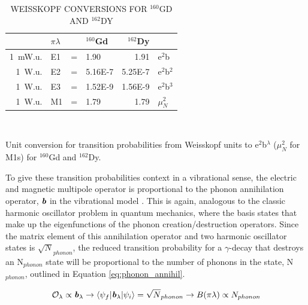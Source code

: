 \begin{table}[ht]
\centering
\caption{WEISSKOPF CONVERSIONS FOR $^{160}$GD AND $^{162}$DY \label{tab:Weisskopf_conversion}}

\begin{tabular}{rlcl|r|l}
 & $\pi\lambda$ &&  $^{160}$Gd & $^{162}$Dy \\ \hline\hline
1~mW.u.& E1 & = & 1.90    & 1.91    & e$^2$b\\
1~W.u. & E2 & = & 5.16E-7 & 5.25E-7 & e$^2$b$^2$\\
1~W.u. & E3 & = & 1.52E-9 & 1.56E-9 & e$^2$b$^3$ \\
1~W.u. & M1 & = & 1.79    & 1.79    & $\mu_N^2$ \\
\end{tabular}\\
\vspace{10pt}
\begin{normalsize}
Unit conversion for transition probabilities from Weisskopf units to e$^2$b$^\lambda$ ($\mu_N^2$ for M1s) for $^{160}$Gd and $^{162}$Dy.
\end{normalsize}
\end{table}

To give these transition probabilities context in a vibrational sense, the electric and magnetic multipole operator is proportional to the phonon annihilation operator, $\textit{\textbf{b}}$ in the vibrational model \cite{Wong_text}. This is again, analogous to the classic harmonic oscillator problem in quantum mechanics, where the basis states that make up the eigenfunctions of the phonon creation/destruction operators. Since the matrix element of this annihilation operator and two harmonic oscillator states is $\sqrt N_{phonon}$, the reduced transition probability for a $\gamma$-decay that destroys an N$_{phonon}$ state will be proportional to the number of phonons in the state, N$_{phonon}$, outlined in Equation \ref{eq:phonon_annihil}.

\begin{equation}\label{eq:phonon_annihil}
\mathcal{O}_\lambda\propto\textbf{\textit{b}}_\lambda\rightarrow \langle\psi_f\vert\textbf{\textit{b}}_\lambda\vert\psi_i\rangle=\sqrt N_{phonon}\rightarrow B(\pi\lambda)\propto N_{phonon}
\end{equation}

